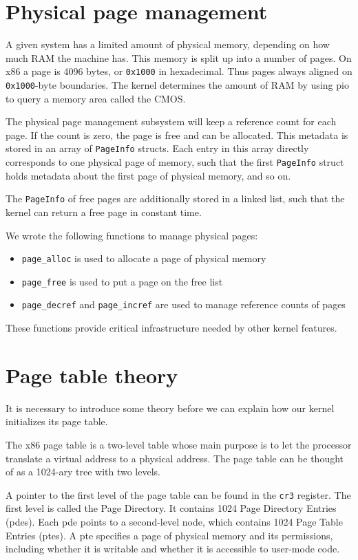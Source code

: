 \documentclass{report}
\begin{document}
\section{Physical page management}
A given system has a limited amount of physical memory, depending on how much
RAM the machine has. This memory is split up into a number of pages. On x86 a
page is 4096 bytes, or \texttt{0x1000} in hexadecimal. Thus pages always aligned on
\texttt{0x1000}-byte boundaries. The kernel determines the amount of RAM by using
\gls{pio} to query a memory area called the CMOS. 

The physical page management subsystem will keep a reference count for each
page. If the count is zero, the page is free and can be allocated. This
metadata is stored in an array of \texttt{PageInfo} structs. Each entry in
this array directly corresponds to one physical page of memory, such that the
first \texttt{PageInfo} struct holds metadata about the first page of physical
memory, and so on.

The \texttt{PageInfo} of free pages are additionally stored in a linked list,
such that the kernel can return a free page in constant time.

We wrote the following functions to manage physical pages:
\begin{itemize}
\item \texttt{page\_alloc} is used to allocate a page of physical memory
\item \texttt{page\_free} is used to put a page on the free list
\item \texttt{page\_decref} and \texttt{page\_incref} are used to manage
reference counts of pages
\end{itemize}
These functions provide critical infrastructure needed by other kernel
features.



\section{Page table theory}
It is necessary to introduce some theory before we can explain how our kernel
initializes its page table.

The x86 page table is a two-level table whose main purpose is to let the
processor translate a virtual address to a physical address. The page table
can be thought of as a 1024-ary tree with two levels. 

A pointer to the first level of the page table can be found in the
\texttt{cr3} register. The first level is called the Page Directory. It
contains 1024 Page Directory Entries (\gls{pde}s). Each \gls{pde} points to a
second-level node, which contains 1024 Page Table Entries (\gls{pte}s). 
A \gls{pte} specifies a page of physical memory and its permissions, including
whether it is writable and whether it is accessible to user-mode code.
\end{document}

